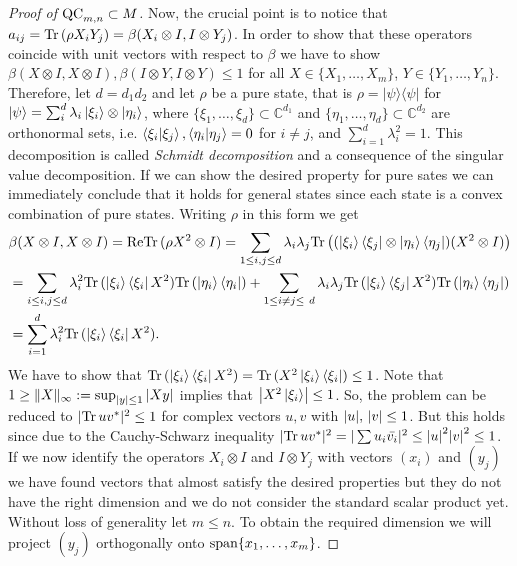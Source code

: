 \begin{proof}[Proof of $ \textup{QC}_{m,n} \subset M $]
	\noindent Now, the crucial point is to notice that $ a_{ij} =\textup{Tr} \, {(\rho X_i Y_j)} =  \beta(X_i \otimes I,I \otimes Y_j) $. In order to show that these operators coincide with unit vectors with respect to $  \beta  $ we have to show
	$ \beta(X \otimes I, X \otimes I), \beta(I \otimes Y, I \otimes Y) \le 1$ for all $ X \in \{X_1,\hdots,X_m \} $, $ Y \in \{Y_1,\hdots,Y_n \} $. 
	Therefore, let $ d = d_1d_2 $ and let $ \rho $ be a pure state, that is $ \rho = \vert \psi \rangle \langle \psi \vert $ for $ \vert \psi \rangle = \sum_{i}^{d}\lambda_i \ket{\xi_i} \otimes \ket{\eta_i} $, where $ \{ \xi_1,\hdots,\xi_d \} \subset \mathbb{C}^{d_1}$ and $ \{  \eta_1,\hdots,\eta_d\} \subset \mathbb{C}^{d_2}$ are orthonormal sets, i.e. $ \braket{\xi_i \vert \xi_j}, \braket{\eta_i \vert \eta_j} = 0 $ for $ i \neq j $, and $ \sum_{i=1}^d \lambda_i^2 = 1 $. This decomposition is called {\itshape Schmidt decomposition} and a consequence of the singular value decomposition. If we can show the desired property for pure sates we can immediately conclude that it holds for general states since each state is a convex combination of pure states. 
	Writing $ \rho $ in this form we get 
	\begin{align*}
	&\beta(X \otimes I, X \otimes I) = \textup{Re} \textup{Tr} \, {(\rho X^2 \otimes I)} =  \sum_{1 \le i,j \le d} \lambda_i\lambda_j \textup{Tr} \, {\big ((\ket{\xi_i} \bra{\xi_j} \otimes \ket{\eta_i}\bra{\eta_j})(X^2 \otimes I)\big ) }  \\
	&= \sum_{i\le i,j \le d}\lambda_i^2 \textup{Tr} \, {(\ket{\xi_i} \bra{\xi_i}X^2)} \textup{Tr} \, {(\ket{\eta_i}\bra{\eta_i})}   +  \sum_{1 \le i \neq j \le \ d}\lambda_i\lambda_j \textup{Tr} \, {(\ket{\xi_i}\bra{\xi_j}X^2)} \textup{Tr} \, {(\ket{\eta_i}\bra{\eta_j})}    \\
	&=  \sum_{i=1}^{d}\lambda_i^2 \textup{Tr} \, {(\ket{\xi_i} \bra{\xi_i}X^2)} .
	\end{align*}
	 We have to show that $ \textup{Tr} \, {(\ket{\xi_i} \bra{\xi_i}X^2)}  = \textup{Tr} \, {(X^2\ket{\xi_i} \bra{\xi_i})}  \le 1 $. 
	Note that $1 \ge  \Vert {X} \Vert_{\infty} := \sup_{{\left|{y}\right|}\le 1} {\left|{Xy}\right|} $ implies that $ {\left|{X^2\ket{\xi_i}}\right|} \le 1 $. So, the problem can be reduced to $ \vert \textup{Tr} \, {uv^*} \vert^2 \le 1 $ for complex vectors $ u,v $ with $ {\left|{u}\right|},\, {\left|{v}\right|} \le 1 $. But this holds since due to the Cauchy-Schwarz inequality 
	$ \vert\textup{Tr} \, {uv^*} \vert^2 = \vert\sum u_i \bar{v_i}\vert^2 \le {\left|{u}\right|}^2{\left|{v}\right|}^2 \le 1 $.
	\noindent If we now identify the operators $ X_i \otimes I $ and $  I \otimes Y_j$ with vectors
	$ (x_i) $ and $ (y_j) $ we have found vectors that almost satisfy the desired properties but they do not have the right dimension and we do not consider the standard scalar product yet. Without loss of generality let $ m \le n $. To obtain the required dimension we will project $ (y_j) $ orthogonally onto $ \textup{span}\{ x_1,\hdots,x_m \} $.

\end{proof}
